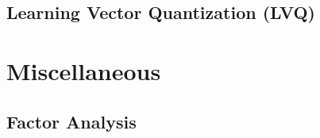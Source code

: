 \subsection{Learning Vector Quantization (LVQ)}
\label{additional:supervised:kNN:LVQ}

\section{Miscellaneous}
\label{additional:misc}

\subsection{Factor Analysis}
\label{additional:misc:factor_ana}

